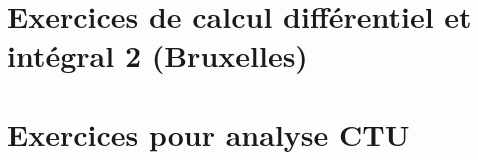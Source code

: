 \chapter{Exercices de calcul différentiel et intégral 2 (Bruxelles)}




\chapter{Exercices pour analyse CTU}





\emptyInputPath
{}
 


